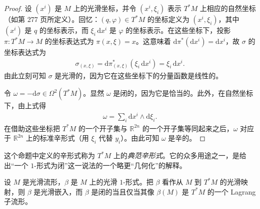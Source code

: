 \documentclass[../../main.tex]{subfiles}
\begin{document}
\begin{proof}
设 $(x^i)$ 是 $M$ 上的光滑坐标，并令 $(x^i,\xi_i)$ 表示 $T^*M$ 上相应的自然坐标（如第 277 页所定义）。回忆：$(q,\varphi)\in T^*M$ 的坐标定义为 $(x^i,\xi_i)$，其中 $(x^i)$ 是 $q$ 的坐标表示，而 $\xi_i\,\mathrm{d}x^i$ 是 $\varphi$ 的坐标表示。在这些坐标下，投影 $\pi:T^*M\to M$ 的坐标表达式为 $\pi(x,\xi)=x$。这意味着 $\mathrm{d}\pi^*(\mathrm{d}x^i)=\mathrm{d}x^i$，故 $\sigma$ 的坐标表达式为
\begin{align}
\sigma_{(x,\xi)}=\mathrm{d}\pi^*_{(x,\xi)}(\xi_i\,\mathrm{d}x^i)=\xi_i\,\mathrm{d}x^i.
\end{align}
由此立刻可知 $\sigma$ 是光滑的，因为它在这些坐标下的分量函数是线性的。

令 $\omega=-\mathrm{d}\sigma\in\Omega^2(T^*M)$。显然 $\omega$ 是闭的，因为它是恰当的。此外，在自然坐标下，由上式得
\begin{align*}
\omega=\sum_i \mathrm{d}x^i\wedge\mathrm{d}\xi_i.
\end{align*}
在借助这些坐标把 $T^*M$ 的一个开子集与 $\mathbb{R}^{2n}$ 的一个开子集等同起来之后，$\omega$ 对应于 $\mathbb{R}^{2n}$ 上的标准辛形式（用 $\xi_i$ 代替 $y_i$）。由此可知 $\omega$ 是辛的。
\end{proof}

这个命题中定义的辛形式称为 $T^*M$ 上的\emph{典范辛形式}。它的众多用途之一，是给出“一个 $1$-形式为闭”这一说法的一个略更“几何化”的解释。

\begin{proposition}\label{proposition:ch22-closed-1form-lagrangian}
设 $M$ 是光滑流形，$\beta$ 是 $M$ 上的光滑 $1$-形式。把 $\beta$ 看作从 $M$ 到 $T^*M$ 的光滑映射，则 $\beta$ 是光滑嵌入，而 $\beta$ 是闭的当且仅当其像 $\beta(M)$ 是 $T^*M$ 的一个 Lagrang 子流形。
\end{proposition}
\end{document}
